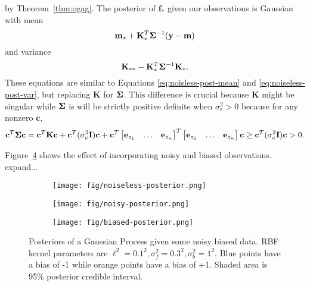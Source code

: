 by Theorem~\ref{thm:ogag}.
The posterior of $\mathbf{f}_*$ given our observations is Gaussian with mean
\begin{equation*}
    \mathbf{m}_* + \mathbf{K}_*^T \boldsymbol{\Sigma}^{-1} (\mathbf{y} - \mathbf{m})
\end{equation*}
and variance
\begin{equation*}
    \mathbf{K}_{* *} - \mathbf{K}_*^T \boldsymbol{\Sigma}^{-1} \mathbf{K}_*.
\end{equation*}
These equations are similar to Equations \ref{eq:noisless-post-mean} and \ref{eq:noiseless-post-var},
but replacing $\mathbf{K}$ for $\boldsymbol{\Sigma}$.
This difference is crucial because $\mathbf{K}$ might be singular
while $\boldsymbol{\Sigma}$ is will be strictly positive definite when $\sigma_{\epsilon}^2 > 0$ because for any nonzero $\mathbf{c}$,
\begin{align*}
    \mathbf{c}^{T} \boldsymbol{\Sigma} \mathbf{c}
    = \mathbf{c}^{T} \mathbf{K} \mathbf{c}
    + \mathbf{c}^{T} (\sigma^2_e \mathbf{I}) \mathbf{c} 
    +
    \mathbf{c}^{T}
    \begin{bmatrix}
        \mathbf{e}_{z_1} & \hdots & \mathbf{e}_{z_n}
    \end{bmatrix}^{ T}
     \begin{bmatrix}
        \mathbf{e}_{z_1} & \hdots & \mathbf{e}_{z_n}
    \end{bmatrix}
    \mathbf{c} \geq \mathbf{c}^{T} (\sigma^2_e \mathbf{I}) \mathbf{c}
    > 0.
\end{align*}


Figure~\ref{fig:gp-posteriors} shows the effect of incorporating noisy and biased observations.
expand...

\begin{figure}
    \centering
    \begin{subfigure}[b]{0.3\textwidth}
        \centering
        \texttt{[image: fig/noiseless-posterior.png]}
        \caption{}
        \label{subfig:noiseless-post}
    \end{subfigure}
    \hfill
    \begin{subfigure}[b]{0.3\textwidth}
        \centering
        \texttt{[image: fig/noisy-posterior.png]}
        \caption{}
        \label{subfig:noisy-posterior}
    \end{subfigure}
    \hfill
    \begin{subfigure}[b]{0.3\textwidth}
        \centering
        \texttt{[image: fig/biased-posterior.png]}
        \caption{}
        \label{subfig:biased-posterior}
    \end{subfigure}
    \hfill
    \caption{Posteriors of a Gaussian Process given some noisy biased data.
        RBF kernel parameters are $\ell^{2} = 0.1^2, \sigma^2_{f} = 0.3 ^ 2, \sigma^2_b = 1^2$.
        Blue points have a bias of -1 while orange points have a bias of +1.
        Shaded area is 95\% posterior credible interval.
    }
    \label{fig:gp-posteriors}
\end{figure}
